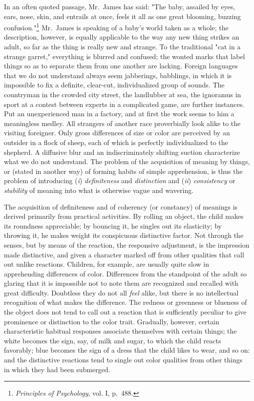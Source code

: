 \documentclass[letterpaper]{book}
\begin{document}
In an often quoted passage, Mr.\ James has said: "The baby, assailed by
eyes, ears, nose, skin, and entrails at once, feels it all as one great
blooming, buzzing
confusion."\footnote{
\emph{Principles of Psychology}, vol. I, p.\ 488.
}
Mr.\ James is speaking of a baby's world taken as a whole; the
description, however, is equally applicable to the way any new thing
strikes an adult, so far as the thing is really new and strange. To the
traditional "cat in a strange garret," everything is blurred and
confused; the wonted marks that label things so as to separate them from
one another are lacking. Foreign languages that we do not understand
always seem jabberings, babblings, in which it is impossible to fix a
definite, clear-cut, individualized group of sounds. The countryman in
the crowded city street, the landlubber at sea, the ignoramus in sport
at a contest between experts in a complicated game, are further
instances. Put an unexperienced man in a factory, and at first the work
seems to him a meaningless medley. All strangers of another race
proverbially look alike to the
visiting
foreigner. Only gross differences of size or color are perceived by an
outsider in a flock of sheep, each of which is perfectly individualized
to the shepherd. A diffusive blur and an indiscriminately shifting
suction characterize what we do not understand. The problem of the
acquisition of meaning by things, or (stated in another way) of forming
habits of simple apprehension, is thus the problem of introducing
(\emph{i}) \emph{definiteness} and \emph{distinction} and (\emph{ii})
\emph{consistency} or \emph{stability} of meaning into what is otherwise
vague and wavering.


The acquisition of definiteness and of coherency (or constancy) of
meanings is derived primarily from practical activities. By rolling an
object, the child makes its roundness appreciable; by bouncing it, he
singles out its elasticity; by throwing it, he makes weight its
conspicuous distinctive factor. Not through the senses, but by means of
the reaction, the responsive adjustment, is the impression made
distinctive, and given a character marked off from other qualities that
call out unlike reactions. Children, for example, are usually quite slow
in apprehending differences of color. Differences from the standpoint of
the adult so glaring that it is impossible not to note them are
recognized and recalled with great difficulty. Doubtless they do not all
\emph{feel} alike, but there is no intellectual recognition of what
makes the difference. The redness or greenness or blueness of the object
does not tend to call out a reaction that is sufficiently peculiar to
give prominence or distinction to the color trait. Gradually, however,
certain characteristic habitual responses associate themselves with
certain things; the white becomes the sign, say, of milk and sugar, to
which the child reacts favorably; blue becomes the sign of a dress that
the child likes to wear, and so on: and
the
distinctive reactions tend to single out color qualities from other
things in which they had been submerged.
\end{document}
